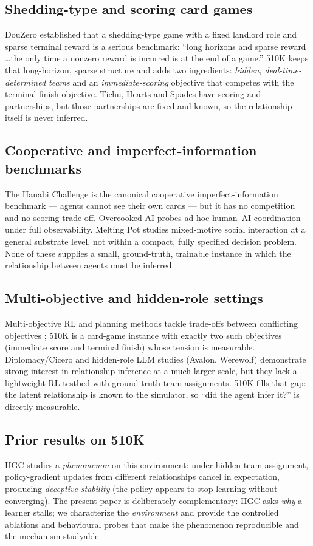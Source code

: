 \documentclass{article}
\begin{document}
\subsection{Shedding-type and scoring card games}
DouZero \citep{douzero} established that a shedding-type game with a fixed
landlord role and sparse terminal reward is a serious benchmark: ``long horizons
and sparse reward \ldots the only time a nonzero reward is incurred is at the
end of a game.'' 510K keeps that long-horizon, sparse structure and adds two
ingredients: \emph{hidden, deal-time-determined teams} and an
\emph{immediate-scoring} objective that competes with the terminal finish
objective. Tichu, Hearts and Spades have
scoring and partnerships, but those partnerships are fixed and known, so the
relationship itself is never inferred.

\subsection{Cooperative and imperfect-information benchmarks}
The Hanabi Challenge \citep{hanabi} is the canonical cooperative
imperfect-information benchmark --- agents cannot see their own cards --- but it
has no competition and no scoring trade-off. Overcooked-AI \citep{overcooked}
probes ad-hoc human--AI coordination under full observability. Melting Pot
\citep{melting} studies mixed-motive social interaction at a general substrate
level, not within a compact, fully specified decision problem. None of these
supplies a small, ground-truth, trainable instance in which the relationship
between agents must be inferred.

\subsection{Multi-objective and hidden-role settings}
Multi-objective RL and planning methods tackle trade-offs between conflicting
objectives \citep{hayes}; 510K is a card-game instance with exactly two such
objectives (immediate score and terminal finish) whose tension is measurable.
Diplomacy/Cicero \citep{cicero} and hidden-role LLM studies (Avalon, Werewolf)
demonstrate strong interest in relationship inference at a much larger scale,
but they lack a lightweight RL testbed with ground-truth team assignments. 510K
fills that gap: the latent relationship is known to the simulator, so ``did the
agent infer it?'' is directly measurable.

\subsection{Prior results on 510K}
IIGC \citep{iigc} studies a \emph{phenomenon} on this environment: under hidden
team assignment, policy-gradient updates from different relationships cancel in
expectation, producing \emph{deceptive stability} (the policy appears to stop
learning without converging). The present paper is deliberately complementary:
IIGC asks \emph{why} a learner stalls; we characterize the \emph{environment}
and provide the controlled ablations and behavioural probes that make the
phenomenon reproducible and the mechanism studyable.
\end{document}
